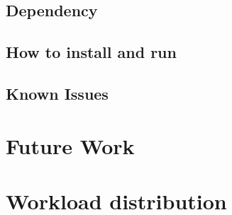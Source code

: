 \subsection{Dependency}

\subsection{How to install and run}

\subsection{Known Issues}

\section{Future Work}

\section{Workload distribution}

